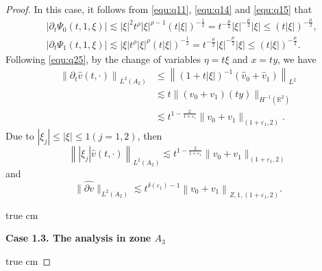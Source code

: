 \documentclass[11pt,twoside]{article}
\newcommand{\R}{\mathbb R}
\newcommand{\p}{\partial}
\newcommand{\f}{\frac}
\theoremstyle{plain}
\theoremstyle{definition}
\theoremstyle{remark}
\numberwithin{equation}{section}
\begin{document}
\begin{proof}
In this case, it follows from  \eqref{equ:q11}, \eqref{equ:q14} and \eqref{equ:q15} that
\begin{equation}\label{equ:q36}
\begin{aligned}
& \left|\p_t\Psi_0(t, 1,\xi)\right| \lesssim|\xi|^2 t^\rho|\xi|^{\rho-1}(t|\xi|)^{-\frac{1}{2}}=t^{-\frac{\mu}{2}}|\xi|^{-\frac{\mu}{2}}|\xi|\leq (t|\xi|)^{-\f{\mu}{2}}, \\
& \left|\p_t\Psi_1(t, 1, \xi)\right|  \lesssim |\xi|t^\rho|\xi|^{\rho}(t|\xi|)^{-\frac{1}{2}}=t^{-\frac{\mu}{2}}|\xi|^{-\frac{\mu}{2}}|\xi|\leq(t|\xi|)^{-\f{\mu}{2}}.
\end{aligned}
\end{equation}
Following \eqref{equ:q25}, by the change of variables $\eta=t\xi$ and $x=ty$, we have
\begin{equation}\label{equ:q37}
\begin{aligned}
\left\|\p_t\hat{v}(t, \cdot)\right\|_{L^2(A_2)} & \leq\left\|(1+t|\xi|)^{-1}(\hat{v}_{0}+\hat{v}_{1})\right\|_{L^{2}} \\
& \lesssim t\|(v_0+v_1)(ty)\|_{H^{-1}(\R^2)}\\
& \lesssim t^{1-\f{2}{1+\varepsilon_1}}\|v_0+v_1\|_{(1+\varepsilon_1, 2)}.
\end{aligned}
\end{equation}
Due to $|\xi_j|\leq|\xi|\leq1 (j=1,2)$, then
\begin{equation}\label{equ:q38}
\left\||\xi_j|\hat{v}(t, \cdot)\right\|_{L^2(A_2)} \lesssim t^{1-\f{2}{1+\varepsilon_1}}\|v_0+v_1\|_{(1+\varepsilon_1, 2)}
\end{equation}
and
\begin{equation}\label{equ:q38}
\|\widehat{\p v}\|_{L^2(A_2)} \lesssim t^{\delta(\varepsilon_1)-1}\left\|v_0+v_1\right\|_{Z, 1,(1+\varepsilon_1, 2)}.
\end{equation}

 true cm

{\bf Case 1.3.  The analysis  in zone $A_3$}

 true cm


\end{proof}
\end{document}
